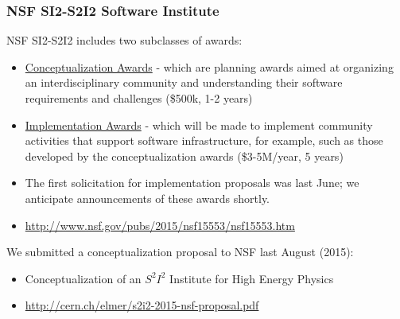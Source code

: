 \begin{frame}
\frametitle{NSF SI2-S2I2 Software Institute}

NSF SI2-S2I2 includes two subclasses of awards:
\begin{itemize}
\item \underline{Conceptualization Awards} - which are planning awards aimed at organizing an interdisciplinary community and understanding their software requirements and challenges (\$500k, 1-2 years)
\item \underline{Implementation Awards} - which will be made to implement community activities that support software infrastructure, for example, such as those developed by the conceptualization awards (\$3-5M/year, 5 years)
\item The first solicitation for implementation proposals was last June; we anticipate announcements of these awards shortly.
\item \url{http://www.nsf.gov/pubs/2015/nsf15553/nsf15553.htm}
\end{itemize}

We submitted a conceptualization proposal to NSF last August (2015):
\begin{itemize}
\item Conceptualization of an $ S^2 I^2 $ Institute for High Energy Physics
\item \url{http://cern.ch/elmer/s2i2-2015-nsf-proposal.pdf}
\end{itemize}

\end{frame}


